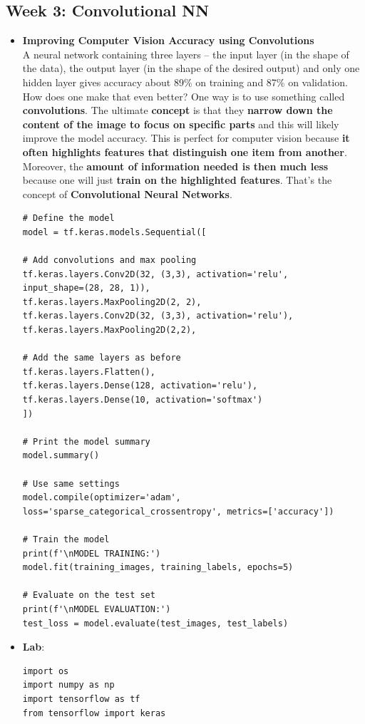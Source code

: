 \documentclass[20pt]{article}
\begin{document}
	\subsection{Week 3: Convolutional NN}
	\begin{itemize}
		\item \textbf{Improving Computer Vision Accuracy using Convolutions}\\
		A neural network containing three layers -- the input layer (in the shape of the data), the output layer (in the shape of the desired output) and only one hidden layer gives accuracy about 89\% on training and 87\% on validation. How does one make that even better? One way is to use something called \textbf{convolutions}. The ultimate \textbf{concept} is that they \textbf{narrow down the content of the image to focus on specific parts} and this will likely improve the model accuracy. This is perfect for computer vision because \textbf{it often highlights features that distinguish one item from another}. Moreover, the \textbf{amount of information needed is then much less} because one will just \textbf{train on the highlighted features}.
		That's the concept of \textbf{Convolutional Neural Networks}.
		\begin{verbatim}
# Define the model
model = tf.keras.models.Sequential([

# Add convolutions and max pooling
tf.keras.layers.Conv2D(32, (3,3), activation='relu',
input_shape=(28, 28, 1)),
tf.keras.layers.MaxPooling2D(2, 2),
tf.keras.layers.Conv2D(32, (3,3), activation='relu'),
tf.keras.layers.MaxPooling2D(2,2),

# Add the same layers as before
tf.keras.layers.Flatten(),
tf.keras.layers.Dense(128, activation='relu'),
tf.keras.layers.Dense(10, activation='softmax')
])

# Print the model summary
model.summary()

# Use same settings
model.compile(optimizer='adam',
loss='sparse_categorical_crossentropy', metrics=['accuracy'])

# Train the model
print(f'\nMODEL TRAINING:')
model.fit(training_images, training_labels, epochs=5)

# Evaluate on the test set
print(f'\nMODEL EVALUATION:')
test_loss = model.evaluate(test_images, test_labels)
		\end{verbatim} 
		\item \textbf{Lab}:
		\begin{verbatim}
import os
import numpy as np
import tensorflow as tf
from tensorflow import keras


\end{verbatim}
\end{itemize}
\end{document}
